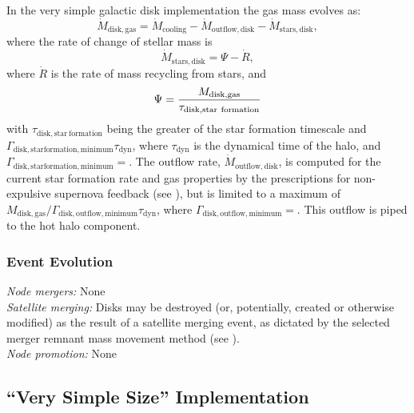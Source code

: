 In the very simple galactic disk implementation the gas mass evolves as:
\begin{equation}
 \dot{M}_\mathrm{disk, gas} = \dot{M}_\mathrm{cooling} - \dot{M}_\mathrm{outflow, disk} - \dot{M}_\mathrm{stars, disk},
\end{equation}
where the rate of change of stellar mass is
\begin{equation}
 \dot{M}_\mathrm{stars, disk} = \Psi - \dot{R},
\end{equation}
where $\dot{R}$ is the rate of mass recycling from stars, and
\begin{equation}
 \Psi = {M_\mathrm{disk, gas} \over \tau_\mathrm{disk, star~formation}}
\end{equation}
with $\tau_\mathrm{disk, star~formation}$ being the greater of the star formation timescale and $\Gamma_\mathrm{disk, star formation, minimum} \tau_\mathrm{dyn}$, where $\tau_\mathrm{dyn}$ is the dynamical time of the halo, and $\Gamma_\mathrm{disk, star formation, minimum}=$\mono{[diskStarFormationTimescaleMinimum]}. The outflow rate, $\dot{M}_\mathrm{outflow, disk}$, is computed for the current star formation rate and gas properties by the prescriptions for non-expulsive supernova feedback (see ), but is limited to a maximum of $M_\mathrm{disk, gas}/ \Gamma_\mathrm{disk, outflow, minimum} \tau_\mathrm{dyn}$, where $\Gamma_\mathrm{disk, outflow, minimum}=$\mono{[diskOutflowTimescaleMinimum]}. This outflow is piped to the hot halo component.

\subsubsection{Event Evolution}

\noindent\emph{Node mergers:} None\\

\noindent\emph{Satellite merging:} Disks may be destroyed (or, potentially, created or otherwise modified) as the result of a satellite merging event, as dictated by the selected merger remnant mass movement method (see ).\\

\noindent\emph{Node promotion:} None\\

\subsection{``Very Simple Size'' Implementation}

